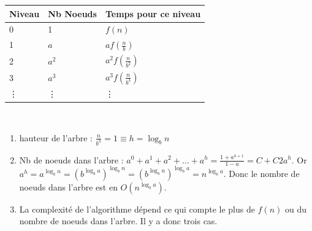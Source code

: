 \begin{tabular}{l|l|l|}
Niveau & Nb Noeuds & Temps pour ce niveau \\ \hline
0 & 1 & $f(n)$ \\ \hline
1 & $a$ & $af(\frac{n}{b})$ \\ \hline
2 & $a^2$ & $a^2f(\frac{n}{b^2})$ \\ \hline
3 & $a^3$ & $a^3f(\frac{n}{b^3})$ \\ \hline
\vdots & \vdots & \vdots 
\end{tabular}
\\
\begin{enumerate}
	\item hauteur de l'arbre : $\frac{n}{b^h} = 1 \equiv h = \log_bn$
	\item Nb de noeuds dans l'arbre : $a^0+a^1+a^2+\ldots+a^h = \frac{1+a^{h+1}}{1-a} = C + C2a^h$. Or $a^h = a^{\log_bn}=(b^{\log_ba})^{\log_bn} =  (b^{\log_bn})^{\log_ba} = n^{\log_ba}$. Donc le nombre de noeuds dans l'arbre est en $O(n^{\log_ba})$.
	\item La complexité de l'algorithme dépend ce qui compte le plus de $f(n)$ ou du nombre de noeuds dans l'arbre. Il y a donc trois cas.
\end{enumerate}



